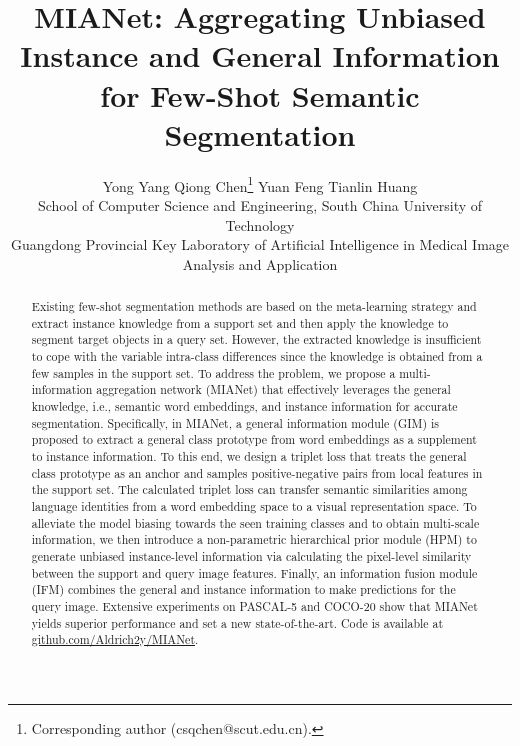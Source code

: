 \documentclass[10pt,twocolumn,letterpaper]{article}
\begin{document}
\title{MIANet: Aggregating Unbiased Instance and General Information for Few-Shot Semantic Segmentation}



\author{Yong Yang \quad Qiong Chen\thanks{Corresponding author (csqchen@scut.edu.cn).} \quad  Yuan Feng \quad Tianlin Huang \\
	 School of Computer Science and Engineering, South China University of Technology\\
	 Guangdong Provincial Key Laboratory of Artificial Intelligence in Medical Image Analysis and Application
}



\maketitle

\begin{abstract}
 Existing few-shot segmentation methods are based on the meta-learning strategy and extract instance knowledge from a support set and then apply the knowledge to segment target objects in a query set. However, the extracted knowledge is insufficient to cope with the variable intra-class differences since the knowledge is obtained from a few samples in the support set. To address the problem, we propose a multi-information aggregation network (MIANet) that effectively leverages the general knowledge, i.e., semantic word embeddings, and instance information for accurate segmentation. Specifically, in MIANet, a general information module (GIM) is proposed to extract a general class prototype from word embeddings as a supplement to instance information. To this end, we design a triplet loss that treats the general class prototype as an anchor and samples positive-negative pairs from local features in the support set. The calculated triplet loss can transfer semantic similarities among language identities from a word embedding space to a visual representation space. To alleviate the model biasing towards the seen training classes and to obtain multi-scale information, we then introduce a non-parametric hierarchical prior module (HPM) to generate unbiased instance-level information via calculating the pixel-level similarity between the support and query image features. Finally, an information fusion module (IFM) combines the general and instance information to make predictions for the query image. Extensive experiments on PASCAL-5 and COCO-20 show that MIANet yields superior performance and set a new state-of-the-art. Code is available at \href{https://github.com/Aldrich2y/MIANet}{github.com/Aldrich2y/MIANet}.
\end{abstract}
\end{document}
